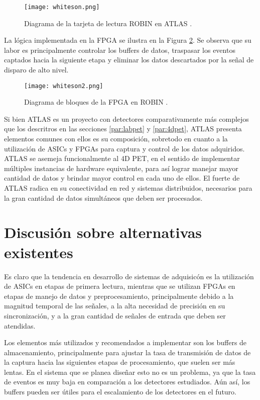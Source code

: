 	\begin{figure}[h]
		\centering
		\texttt{[image: whiteson.png]}
		\caption{Diagrama de la tarjeta de lectura ROBIN en ATLAS \cite{Whiteson2016TheSystem}.}
		\label{fig:whiteson}
	\end{figure}
	
	La lógica implementada en la FPGA se ilustra en la Figura \ref{fig:whiteson2}. Se observa que su labor es principalmente controlar los buffers de datos, traspasar los eventos captados hacia la siguiente etapa y eliminar los datos descartados por la señal de disparo de alto nivel.
	
	\begin{figure}[h]
		\centering
		\texttt{[image: whiteson2.png]}
		\caption{Diagrama de bloques de la FPGA en ROBIN \cite{Whiteson2016TheSystem}.}
		\label{fig:whiteson2}
	\end{figure}
	
	\newpage
	Si bien ATLAS es un proyecto con detectores comparativamente más complejos que los descritros en las secciones \ref{par:labpet} y \ref{par:4dpet}, ATLAS presenta elementos comunes con ellos es su composición, sobretodo en cuanto a la utilización de ASICs y FPGAs para captura y control de los datos adquiridos. ATLAS se asemeja funcionalmente al 4D PET, en el sentido de implementar múltiples instancias de hardware equivalente, para así lograr manejar mayor cantidad de datos y brindar mayor control en cada uno de ellos. El fuerte de ATLAS radica en su conectividad en red y sistemas distribuidos, necesarios para la gran cantidad de datos simultáneos que deben ser procesados.


\section{Discusión sobre alternativas existentes}
	Es claro que la tendencia en desarrollo de sistemas de adquisicón es la utilización de ASICs en etapas de primera lectura, mientras que se utilizan FPGAs en etapas de manejo de datos y preprocesamiento, principalmente debido a la magnitud temporal de las señales, a la alta necesidad de precisión en su sincronización, y a la gran cantidad de señales de entrada que deben ser atendidas.
	
	Los elementos más utilizados y recomendados a implementar son los buffers de almacenamiento, principalmente para ajustar la tasa de transmisión de datos de la captura hacia las siguientes etapas de procesamiento, que suelen ser más lentas. En el sistema que se planea diseñar esto no es un problema, ya que la tasa de eventos es muy baja en comparación a los detectores estudiados. Aún así, los buffers pueden ser útiles para el escalamiento de los detectores en el futuro.
	
